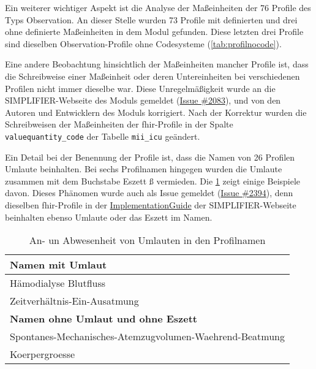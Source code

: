 Ein weiterer wichtiger Aspekt ist die Analyse der Maßeinheiten der 76 Profile des Typs \glqq Observation\grqq{}. An dieser Stelle wurden 73 Profile mit definierten und drei ohne definierte Maßeinheiten in dem Modul gefunden. Diese letzten drei Profile sind dieselben \glqq Observation\grqq{}-Profile ohne Codesysteme (\ref{tab:profilnocode}).

Eine andere Beobachtung hinsichtlich der Maßeinheiten mancher Profile ist, dass die Schreibweise einer Maßeinheit oder deren Untereinheiten bei verschiedenen Profilen nicht immer dieselbe war. Diese Unregelmäßigkeit wurde an die SIMPLIFIER-Webseite des Moduls gemeldet (\href{https://simplifier.net/medizininformatikinitiative-modul-intensivmedizin/~issues/2083}{Issue \#2083}), und von den Autoren und Entwicklern des Moduls korrigiert. Nach der Korrektur wurden die Schreibweisen der Maßeinheiten der \ac{fhir}-Profile in der Spalte \texttt{valuequantity\_code} der Tabelle \texttt{mii\_icu} geändert.

Ein Detail bei der Benennung der Profile ist, dass die Namen von 26 Profilen Umlaute beinhalten. Bei sechs Profilnamen hingegen wurden die Umlaute zusammen mit dem Buchstabe Eszett \glqq ß\grqq{} vermieden. Die \ref{tab:umlaut} zeigt einige Beispiele davon. Dieses Phänomen wurde auch als Issue gemeldet (\href{https://simplifier.net/medizininformatikinitiative-modul-intensivmedizin/~issues/2394}{Issue \#2394}), denn dieselben \ac{fhir}-Profile in der \href{https://simplifier.net/guide/MedizininformatikInitiative-ModulICU-ImplementationGuide/IGMIIKDSModulICU?version=current}{ImplementationGuide} der SIMPLIFIER-Webseite beinhalten ebenso Umlaute oder das Eszett im Namen.

\begin{table}[ht]
	\centering 
	\caption[An- un Abwesenheit von Umlauten in den Profilnamen]{An- un Abwesenheit von Umlauten in den Profilnamen}
	\label{tab:umlaut}
	\begin{tabular}{|l|}
		\hline 
		\bfseries Namen mit Umlaut \\ \hline
		Hämodialyse Blutfluss \\ \hline 
		Zeitverhältnis-Ein-Ausatmung \\ \hline \hline
		\bfseries Namen ohne Umlaut und ohne Eszett\\ \hline
	    Spontanes-Mechanisches-Atemzugvolumen-Waehrend-Beatmung\\ \hline            
		Koerpergroesse \\ \hline                
	\end{tabular}
\end{table}